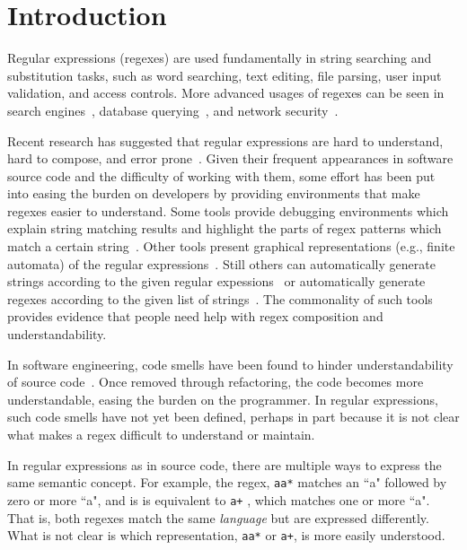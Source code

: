 \section{Introduction }

Regular expressions (regexes) are used fundamentally in string searching and substitution tasks, such as word searching, text editing, file parsing, user input validation, and access controls. More advanced usages of regexes can be seen in search engines~\cite{zhao2005fully}, database querying~\cite{Yeole:2011:ADT:1980022.1980229}, and network security~\cite{network,hutchings2002assisting,ficara2008improved}.

Recent research has suggested that regular expressions are hard to understand, hard to compose, and error prone~\cite{Spishak:2012:TSR:2318202.2318207}.
Given their frequent appearances in software source code and the difficulty of working with them, some effort has been put into easing the burden on developers by providing environments that make regexes easier to understand. Some tools provide debugging environments which explain string matching results and highlight the parts of regex patterns which match a certain string~\cite{regex101,regexr}. Other tools present graphical representations (e.g., finite automata) of the regular expressions~\cite{regexper,rise4fun}. Still others can automatically generate strings according to the given regular expessions~\cite{hampi,rex} or automatically generate regexes according to the given list of strings~\cite{Babbar:2010:CBA:1871840.1871848, Li:2008:REL:1613715.1613719}.
The commonality of such tools provides evidence that people need help with regex composition and understandability.

In software engineering, code smells have been found to hinder understandability of source code~\cite{abbes2011empirical, du2006does}.
Once removed through refactoring, the code becomes more understandable, easing the burden on the programmer.
In regular expressions, such code smells have not yet been defined, perhaps in part because it is not clear what makes a regex difficult to understand or maintain. 

In regular expressions as in source code, there are multiple ways to express the same semantic concept.
For example, the regex, \verb!aa*! matches an ``a" followed by zero or more ``a", and is is equivalent to \verb!a+! , which matches one or more ``a".
That is, both regexes match the same \emph{language} but are expressed differently. What is not clear is which representation,  \verb!aa*!  or  \verb!a+!, is more easily understood.

